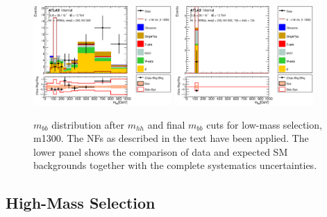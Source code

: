 \begin{figure}
\begin{center}
\includegraphics*[width=0.47\textwidth] {figures/Unblinded_mbb/C_reOpt700_mww_bbpt210_wwpt250_hh1300_bbMass_regionA_met25d020.eps}
\includegraphics*[width=0.47\textwidth] {figures/Unblinded_mbb/C_reOpt700_mww_bbpt210_wwpt250_hh1300_mbb_bbMass_regionA_met25d020.eps}
\caption[$m_{bb}$ distribution after $m_{hh}$ and final $m_{bb}$ cuts for low-mass selection, m1300.]{$m_{bb}$ distribution after $m_{hh}$ and final $m_{bb}$ cuts for low-mass selection, m1300. The NFs as described in the text have been applied. The lower panel shows the comparison of data and expected SM backgrounds together with the complete systematics uncertainties.}
\end{center}
\end{figure}
\clearpage

\subsection{High-Mass Selection}



